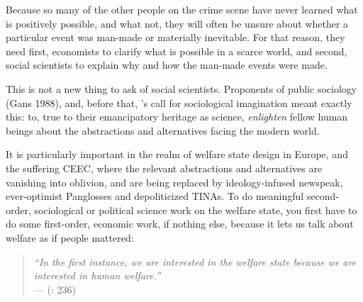 Because so many of the other people on the crime scene have never learned what is positively possible, and what not, they will often be unsure about whether a particular event was man-made or materially inevitable. For that reason, they need first, economists to clarify what is possible in a scarce world, and second, social scientists to explain why and how the man-made events were made.

This is not a new thing to ask of social scientists. Proponents of public sociology (Gans 1988), and, before that, \citeauthor{Mills-1959-aa}'s call for sociological imagination meant exactly this: to, true to their emancipatory heritage as science, \emph{enlighten} fellow human beings about the abstractions and alternatives facing the modern world.

It is particularly important in the realm of welfare state design in Europe, and the suffering \gls{CEEC}, where the relevant abstractions and alternatives are vanishing into oblivion, and are being replaced by ideology-infused newspeak, ever-optimist Panglosses and depoliticized TINAs. To do meaningful second-order, sociological or political science work on the welfare state, you first have to do some first-order, economic work, if nothing else, because it lets us talk about welfare as if people mattered:
\begin{quote}
	\emph{``In the first instance, we are interested in the welfare state because we are interested in human welfare.''}\\
	--- \citeauthor{Haggard2009} (\citeyear{Haggard2009}: 236)
\end{quote}


